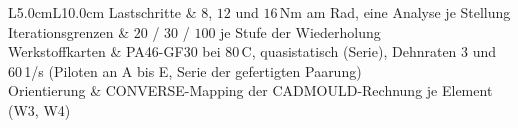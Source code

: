 \begin{table}[htbp]
\begin{tabular}{L{5.0cm}L{10.0cm}}
		\hline
		Lastschritte        & $8$, $12$ und $16$\,Nm am Rad, eine Analyse je Stellung                                                                                                                                                                 \\
		\hline
		Iterationsgrenzen   & $20$ / $30$ / $100$ je Stufe der Wiederholung                                                                                                                                                                           \\
		\hline
		Werkstoffkarten     & PA46-GF30 bei $80$\,\textdegree C, quasistatisch (Serie), Dehnraten $3$ und $60$\,1/s (Piloten an A bis E, Serie der gefertigten Paarung)                                                                    \\
		\hline
		Orientierung        & CONVERSE-Mapping der CADMOULD-Rechnung je Element (W3, W4)                                                                                                                                                            \\
		\hline
	\end{tabular}
\end{table}
